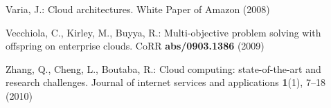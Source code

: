 \begin{thebibliography}{10}
Varia, J.: Cloud architectures.
\newblock White Paper of Amazon  (2008)

Vecchiola, C., Kirley, M., Buyya, R.: Multi-objective problem solving with
  offspring on enterprise clouds.
\newblock CoRR \textbf{abs/0903.1386} (2009)

Zhang, Q., Cheng, L., Boutaba, R.: Cloud computing: state-of-the-art and
  research challenges.
\newblock Journal of internet services and applications \textbf{1}(1), 7--18
  (2010)

\end{thebibliography}








